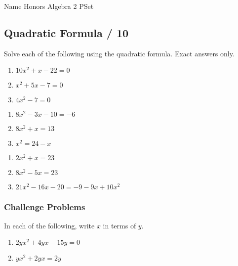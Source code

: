 \documentclass{article}
\newcounter{PS}
\begin{document}
Name \makebox[3in]{\hrulefill} \hfill Honors Algebra 2 PSet

\subsection*{Quadratic Formula \hfill \makebox[0.35in]{\hrulefill} / 10}

Solve each of the following using the quadratic formula. Exact answers only.

\begin{multicols}{3}
\begin{enumerate}
    \item \quad $10x^2+x-22=0$
    \item \quad $x^2+5x-7=0$
    \item \quad $4x^2-7=0$
\setcounter{PS}{\value{enumi}}
\end{enumerate}
\end{multicols}
\vfill

\begin{multicols}{3}
\begin{enumerate}
\setcounter{enumi}{\value{PS}}
    \item \quad $8x^2-3x-10=-6$
    \item \quad $8x^2+x=13$
    \item \quad $x^2=24-x$
\setcounter{PS}{\value{enumi}}
\end{enumerate}
\end{multicols}
\vfill

\begin{multicols}{3}
\begin{enumerate}
\setcounter{enumi}{\value{PS}}
    \item \quad $2x^2+x=23$
    \item \quad $8x^2-5x=23$
    \item \quad $21x^2-16x-20=-9-9x+10x^2$
\setcounter{PS}{\value{enumi}}
\end{enumerate}
\end{multicols}
\vfill

\subsubsection*{Challenge Problems}
In each of the following, write $x$ in terms of $y$.
\begin{multicols}{2}
\begin{enumerate}
\setcounter{enumi}{\value{PS}}
    \item $2yx^2 + 4yx - 15y = 0$
    \item $yx^2 + 2yx = 2y$
\end{enumerate}
\end{multicols}
\vspace{1.25in}
\end{document}

